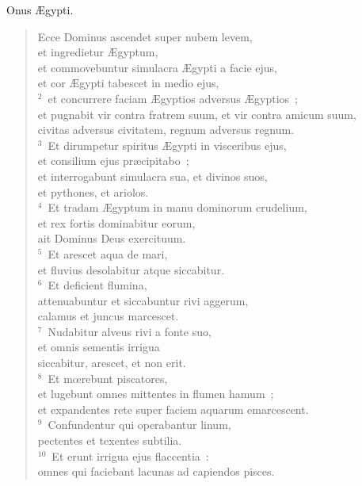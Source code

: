 \lettrine[lines=3,image=true,loversize=0.05,lraise=-0.03]{O}{}nus \AE gypti. \begin{flushleft}\begin{verse}\vspace{6pt}Ecce Dominus ascendet super nubem levem,\\ et ingredietur \AE gyptum,\\ et commovebuntur simulacra \AE gypti a facie ejus,\\ et cor \AE gypti tabescet in medio ejus,\\
${}^{2}$~et concurrere faciam \AE gyptios adversus \AE gyptios~;\\ et pugnabit vir contra fratrem suum, et vir contra amicum suum,\\ civitas adversus civitatem, regnum adversus regnum.\\
${}^{3}$~Et dirumpetur spiritus \AE gypti in visceribus ejus,\\ et consilium ejus pr\ae cipitabo~;\\ et interrogabunt simulacra sua, et divinos suos,\\ et pythones, et ariolos.\\
${}^{4}$~Et tradam \AE gyptum in manu dominorum crudelium,\\ et rex fortis dominabitur eorum,\\ ait Dominus Deus exercituum.\\
${}^{5}$~Et arescet aqua de mari,\\ et fluvius desolabitur atque siccabitur.\\
${}^{6}$~Et deficient flumina,\\ attenuabuntur et siccabuntur rivi aggerum,\\ calamus et juncus marcescet.\\
${}^{7}$~Nudabitur alveus rivi a fonte suo,\\ et omnis sementis irrigua\\ siccabitur, arescet, et non erit.\\
${}^{8}$~Et mœrebunt piscatores,\\ et lugebunt omnes mittentes in flumen hamum~;\\ et expandentes rete super faciem aquarum emarcescent.\\
${}^{9}$~Confundentur qui operabantur linum,\\ pectentes et texentes subtilia.\\
${}^{10}$~Et erunt irrigua ejus flaccentia~:\\ omnes qui faciebant lacunas ad capiendos pisces.\\

\end{verse}
\end{flushleft}
